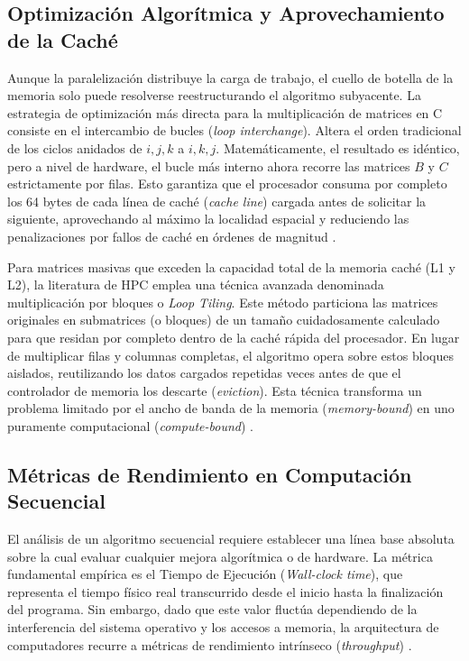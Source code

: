 \subsection{Optimización Algorítmica y Aprovechamiento de la Caché}
Aunque la paralelización distribuye la carga de trabajo, el cuello de botella de la memoria solo puede resolverse reestructurando el algoritmo subyacente. La estrategia de optimización más directa para la multiplicación de matrices en C consiste en el intercambio de bucles (\textit{loop interchange}). Altera el orden tradicional de los ciclos anidados de \(i, j, k\) a \(i, k, j\). Matemáticamente, el resultado es idéntico, pero a nivel de hardware, el bucle más interno ahora recorre las matrices \(B\) y \(C\) estrictamente por filas. Esto garantiza que el procesador consuma por completo los 64 bytes de cada línea de caché (\textit{cache line}) cargada antes de solicitar la siguiente, aprovechando al máximo la localidad espacial y reduciendo las penalizaciones por fallos de caché en órdenes de magnitud \parencite{Lam1991Cache}.

Para matrices masivas que exceden la capacidad total de la memoria caché (L1 y L2), la literatura de HPC emplea una técnica avanzada denominada multiplicación por bloques o \textit{Loop Tiling}. Este método particiona las matrices originales en submatrices (o bloques) de un tamaño cuidadosamente calculado para que residan por completo dentro de la caché rápida del procesador. En lugar de multiplicar filas y columnas completas, el algoritmo opera sobre estos bloques aislados, reutilizando los datos cargados repetidas veces antes de que el controlador de memoria los descarte (\textit{eviction}). Esta técnica transforma un problema limitado por el ancho de banda de la memoria (\textit{memory-bound}) en uno puramente computacional (\textit{compute-bound}) \parencite{Grama2003Introduction}.

\subsection{Métricas de Rendimiento en Computación Secuencial}
El análisis de un algoritmo secuencial requiere establecer una línea base absoluta sobre la cual evaluar cualquier mejora algorítmica o de hardware. La métrica fundamental empírica es el Tiempo de Ejecución (\textit{Wall-clock time}), que representa el tiempo físico real transcurrido desde el inicio hasta la finalización del programa. Sin embargo, dado que este valor fluctúa dependiendo de la interferencia del sistema operativo y los accesos a memoria, la arquitectura de computadores recurre a métricas de rendimiento intrínseco (\textit{throughput}) \parencite{Patterson2017Computer}.

